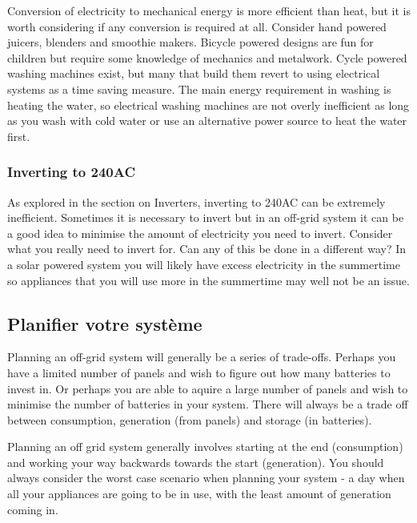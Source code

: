\documentclass{article}
\theoremstyle{definition}
\theoremstyle{definition}
\theoremstyle{remark}
\begin{document}
      Conversion of electricity to mechanical energy is more efficient than heat, but it is worth considering if any conversion is required at all. Consider hand powered juicers, blenders and smoothie makers. Bicycle powered designs are fun for children but require some knowledge of mechanics and metalwork. Cycle powered washing machines exist, but many that build them revert to using electrical systems as a time saving measure. The main energy requirement in washing is heating the water, so electrical washing machines are not overly inefficient as long as you wash with cold water or use an alternative power source to heat the water first. 
    

    \subsubsection{Inverting to 240AC} %
    \label{ssub:inverting_to_240ac}

      As explored in the section on Inverters, inverting to 240AC can be extremely inefficient. Sometimes it is necessary to invert but in an off-grid system it can be a good idea to minimise the amount of electricity you need to invert. Consider what you really need to invert for. Can any of this be done in a different way? In a solar powered system you will likely have excess electricity in the summertime so appliances that you will use more in the summertime may well not be an issue.
    
  

  {\color{blue}\subsection{Planifier votre système}} %
  \label{sub:planifier_votre_systeme}

    Planning an off-grid system will generally be a series of trade-offs. Perhaps you have a limited number of panels and wish to figure out how many batteries to invest in. Or perhaps you are able to aquire a large number of panels and wish to minimise the number of batteries in your system. There will always be a trade off between consumption, generation (from panels) and storage (in batteries). 

    Planning an off grid system generally involves starting at the end (consumption) and working your way backwards towards the start (generation). You should always consider the worst case scenario when planning your system - a day when all your appliances are going to be in use, with the least amount of generation coming in.
  
\end{document}
